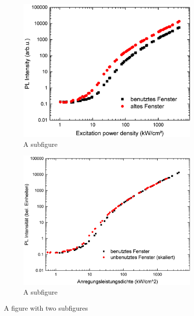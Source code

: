 \begin{figure}
    \centering
    \begin{subfigure}{0.5\textwidth}
      \centering
      \includegraphics[width=0.9\linewidth]{Bilder/uvsilicavergleich.pdf}
      \caption{A subfigure}
      \label{fig:sub1}
    \end{subfigure}%
    \begin{subfigure}{0.5\textwidth}
      \centering
      \includegraphics[width=0.9\linewidth]{Bilder/uvsilicaVergleichSkaliert.pdf}
      \caption{A subfigure}
      \label{fig:sub2}
    \end{subfigure}
    \caption{A figure with two subfigures}
    \label{fig:test}
    \end{figure}

